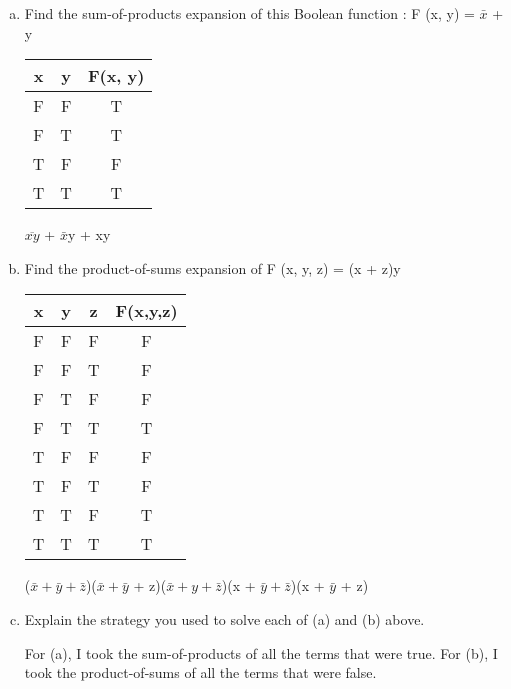 \documentclass{article} %
\begin{document}
    \begin{enumerate}[(a)]
      \item {Find the sum-of-products expansion of this Boolean function : F (x, y) = $\bar{x}$ + y}
      
      \begin{center}
        \begin{tabular}{|c|c|c|}
          \hline
          x & y & F(x, y) \\
          \hline
          F & F & T \\
          F & T & T \\
          T & F & F \\
          T & T & T \\
          \hline
          
        \end{tabular}
      \end{center}

      $\overline{xy}$ + $\bar{x}$y + xy

      \item {Find the product-of-sums expansion of F (x, y, z) = (x + z)y}
      
      \begin{center}
        \begin{tabular}{|c|c|c|c|}
          \hline
          x & y & z & F(x,y,z) \\
          \hline
          F & F & F & F \\
          F & F & T & F \\
          F & T & F & F \\
          F & T & T & T \\
          T & F & F & F \\
          T & F & T & F \\
          T & T & F & T \\
          T & T & T & T \\
          \hline
          
        \end{tabular}
      \end{center}

      ($\bar{x} + \bar{y} + \bar{z}$)($\bar{x} + \bar{y}$ + z)($\bar{x} + y + \bar{z}$)(x + $\bar{y} + \bar{z}$)(x + $\bar{y}$ + z)

      \item{Explain the strategy you used to solve each of (a) and (b) above.}
      
      For (a), I took the sum-of-products of all the terms that were true. For (b), I took the product-of-sums of all the terms that were false.
      
    \end{enumerate}
\end{document}
